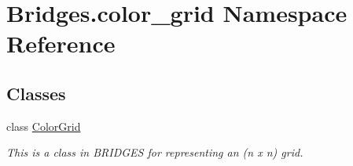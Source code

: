 \hypertarget{namespace_bridges_1_1color__grid}{}\section{Bridges.\+color\+\_\+grid Namespace Reference}
\label{namespace_bridges_1_1color__grid}
\subsection*{Classes}
\begin{DoxyCompactItemize}
\item 
class \mbox{\hyperlink{class_bridges_1_1color__grid_1_1_color_grid}{Color\+Grid}}
\begin{DoxyCompactList}\small\item\em This is a class in B\+R\+I\+D\+G\+ES for representing an (n x n) grid. \end{DoxyCompactList}\end{DoxyCompactItemize}
